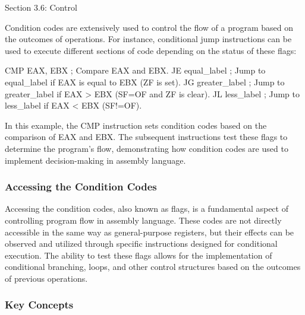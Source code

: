 \begin{notes}{Section 3.6: Control}
    \begin{highlight}
        Condition codes are extensively used to control the flow of a program based on the outcomes of operations. For instance, conditional jump instructions can be used to execute different sections 
        of code depending on the status of these flags:
    
    \begin{code}[Assembly]
    CMP EAX, EBX      ; Compare EAX and EBX.
    JE equal_label    ; Jump to equal_label if EAX is equal to EBX (ZF is set).
    JG greater_label  ; Jump to greater_label if EAX > EBX (SF=OF and ZF is clear).
    JL less_label     ; Jump to less_label if EAX < EBX (SF!=OF).
    \end{code}
    
        In this example, the CMP instruction sets condition codes based on the comparison of EAX and EBX. The subsequent instructions test these flags to determine the program's flow, demonstrating 
        how condition codes are used to implement decision-making in assembly language.
    \end{highlight}

    \subsubsection*{Accessing the Condition Codes}

    Accessing the condition codes, also known as flags, is a fundamental aspect of controlling program flow in assembly language. These codes are not directly accessible in the same way as general-purpose 
    registers, but their effects can be observed and utilized through specific instructions designed for conditional execution. The ability to test these flags allows for the implementation of conditional 
    branching, loops, and other control structures based on the outcomes of previous operations.
    
    \subsubsection*{Key Concepts}
    

\end{notes}
